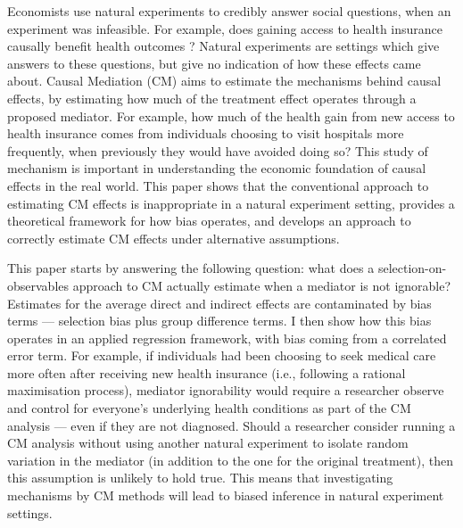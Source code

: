 Economists use natural experiments to credibly answer social questions, when an experiment was infeasible.
For example, does gaining access to health insurance causally benefit health outcomes \citep{finkelstein2008oregon}?
Natural experiments are settings which give answers to these questions, but give no indication of how these effects came about.
Causal Mediation (CM) aims to estimate the mechanisms behind causal effects, by estimating how much of the treatment effect operates through a proposed mediator.
For example, how much of the health gain from new access to health insurance comes from individuals choosing to visit hospitals more frequently, when previously they would have avoided doing so?
This study of mechanism is important in understanding the economic foundation of causal effects in the real world.
This paper shows that the conventional approach to estimating CM effects is inappropriate in a natural experiment setting, provides a theoretical framework for how bias operates, and develops an approach to correctly estimate CM effects under alternative assumptions.


This paper starts by answering the following question: what does a selection-on-observables approach to CM actually estimate when a mediator is not ignorable?
Estimates for the average direct and indirect effects are contaminated by bias terms --- selection bias plus group difference terms.
I then show how this bias operates in an applied regression framework, with bias coming from a correlated error term.
For example, if individuals had been choosing to seek medical care more often after receiving new health insurance (i.e., following a rational maximisation process),
mediator ignorability would require a researcher observe and control for everyone's underlying health conditions as part of the CM analysis --- even if they are not diagnosed.
Should a researcher consider running a CM analysis without using another natural experiment to isolate random variation in the mediator (in addition to the one for the original treatment), then this assumption is unlikely to hold true.
This means that investigating mechanisms by CM methods will lead to biased inference in natural experiment settings.

